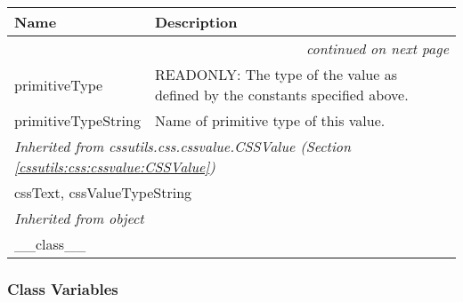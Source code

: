     \vspace{-1cm}
\hspace{\varindent}\begin{longtable}{|p{\varnamewidth}|p{\vardescrwidth}|l}
\cline{1-2}
\cline{1-2} \centering \textbf{Name} & \centering \textbf{Description}& \\
\cline{1-2}
\endhead\cline{1-2}\multicolumn{3}{r}{\small\textit{continued on next page}}\\\endfoot\cline{1-2}
\endlastfoot\raggedright p\-r\-i\-m\-i\-t\-i\-v\-e\-T\-y\-p\-e\- & \raggedright READONLY: The type of the value as defined by the constants specified above.&\\
\cline{1-2}
\raggedright p\-r\-i\-m\-i\-t\-i\-v\-e\-T\-y\-p\-e\-S\-t\-r\-i\-n\-g\- & \raggedright Name of primitive type of this value.&\\
\cline{1-2}
\multicolumn{2}{|l|}{\textit{Inherited from cssutils.css.cssvalue.CSSValue \textit{(Section \ref{cssutils:css:cssvalue:CSSValue})}}}\\
\multicolumn{2}{|p{\varwidth}|}{\raggedright cssText, cssValueTypeString}\\
\cline{1-2}
\multicolumn{2}{|l|}{\textit{Inherited from object}}\\
\multicolumn{2}{|p{\varwidth}|}{\raggedright \_\_class\_\_}\\
\cline{1-2}
\end{longtable}



  \subsubsection{Class Variables}

